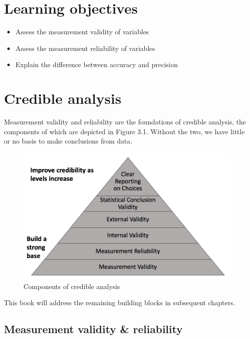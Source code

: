 \documentclass[
]{book}
\providecommand{\tightlist}{%
  \setlength{\itemsep}{0pt}\setlength{\parskip}{0pt}}
\newenvironment{learncheck}%
{%
  \par\vspace{\baselineskip}\noindent 
  \color{Exercise}\begin{itshape}%
  \par\vspace{\baselineskip}\noindent\ignorespaces 
}%
{%
  \end{itshape}\ignorespacesafterend 
}
\begin{document}
\hypertarget{lo3}{%
\section{Learning objectives}\label{lo3}}

\begin{learncheck}
\begin{itemize}
\tightlist
\item
  Assess the measurement validity of variables
\item
  Assess the measurement reliability of variables
\item
  Explain the difference between accuracy and precision
\end{itemize}
\end{learncheck}

\hypertarget{credible-analysis}{%
\section{Credible analysis}\label{credible-analysis}}

Measurement validity and reliability are the foundations of credible analysis, the components of which are depicted in Figure 3.1. Without the two, we have little or no basis to make conclusions from data.

\begin{figure}
\includegraphics[width=13.58in]{images/credible} \caption{Components of credible analysis}\label{fig:credfig}
\end{figure}

This book will address the remaining building blocks in subsequent chapters.

\hypertarget{measurement-validity-reliability}{%
\subsection{Measurement validity \& reliability}\label{measurement-validity-reliability}}
\end{document}

